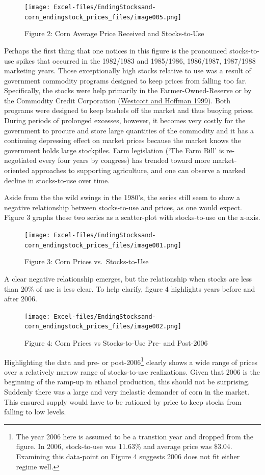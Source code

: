 \documentclass[
]{book}
\begin{document}
\begin{figure}
\centering
\texttt{[image: Excel-files/EndingStocksand-corn\_endingstock\_prices\_files/image005.png]}
\caption{Figure 2: Corn Average Price Received and Stocks-to-Use}
\end{figure}

Perhaps the first thing that one notices in this figure is the pronounced stocks-to-use spikes that occurred in the 1982/1983 and 1985/1986, 1986/1987, 1987/1988 marketing years. Those exceptionally high stocks relative to use was a result of government commodity programs designed to keep prices from falling too far. Specifically, the stocks were help primarily in the Farmer-Owned-Reserve or by the Commodity Credit Corporation (\protect\hyperlink{ref-westcott1999price}{Westcott and Hoffman 1999}). Both programs were designed to keep bushels off the market and thus buoying prices. During periods of prolonged excesses, however, it becomes very costly for the government to procure and store large quantities of the commodity and it has a continuing depressing effect on market prices because the market knows the government holds large stockpiles. Farm legislation (`The Farm Bill' is re-negotiated every four years by congress) has trended toward more market-oriented approaches to supporting agriculture, and one can observe a marked decline in stocks-to-use over time.

Aside from the the wild swings in the 1980's, the series still seem to show a negative relationship between stocks-to-use and prices, as one would expect. Figure 3 graphs these two series as a scatter-plot with stocks-to-use on the x-axis.

\begin{figure}
\centering
\texttt{[image: Excel-files/EndingStocksand-corn\_endingstock\_prices\_files/image001.png]}
\caption{Figure 3: Corn Prices vs.~Stocks-to-Use}
\end{figure}

A clear negative relationship emerges, but the relationship when stocks are less than 20\% of use is less clear. To help clarify, figure 4 highlights years before and after 2006.

\begin{figure}
\centering
\texttt{[image: Excel-files/EndingStocksand-corn\_endingstock\_prices\_files/image002.png]}
\caption{Figure 4: Corn Prices vs Stocks-to-Use Pre- and Post-2006}
\end{figure}

Highlighting the data and pre- or post-2006\footnote{The year 2006 here is assumed to be a transtion year and dropped from the figure. In 2006, stock-to-use was 11.63\% and average price was \$3.04. Examining this data-point on Figure 4 suggests 2006 does not fit either regime well.} clearly shows a wide range of prices over a relatively narrow range of stocks-to-use realizations. Given that 2006 is the beginning of the ramp-up in ethanol production, this should not be surprising. Suddenly there was a large and very inelastic demander of corn in the market. This ensured supply would have to be rationed by price to keep stocks from falling to low levels.
\end{document}
